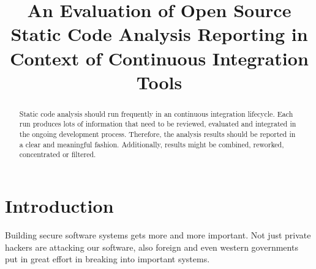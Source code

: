 \documentclass[conference]{IEEEtran}
\begin{document}
%
\title{An Evaluation of Open Source Static Code Analysis Reporting in Context of Continuous Integration Tools}






\author{
	}








\maketitle


\begin{abstract}
Static code analysis should run frequently in an continuous integration lifecycle. Each run produces lots of information that need to be reviewed, evaluated and integrated in the ongoing development process. Therefore, the analysis results should be reported in a clear and meaningful fashion. Additionally, results might be combined, reworked, concentrated or filtered.
\end{abstract}


\IEEEpeerreviewmaketitle



\section{Introduction}
Building secure software systems gets more and more important. Not just private hackers are attacking our software, also foreign and even western governments put in great effort in breaking into important systems\cite{NSAHacking}.
\end{document}
